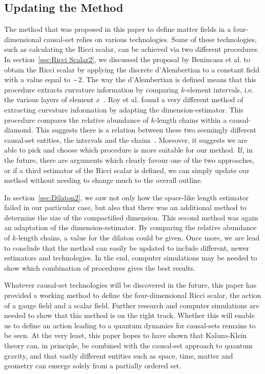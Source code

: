 \documentclass[a4paper,12pt]{article}
\numberwithin{equation}{section}
\begin{document}
\subsection{Updating the Method}
\label{sec:Updating the Method}

The method that was proposed in this paper to define matter fields in a four-dimensional causal-set relies on various technologies. Some of these technologies, such as calculating the Ricci scalar, can be achieved via two different procedures. In section~\ref{sec:Ricci Scalar2}, we discussed the proposal by Benincasa et al. to obtain the Ricci scalar by applying the discrete d'Alembertian to a constant field with a value equal to $-2$. The way the d'Alembertian is defined means that this procedure extracts curvature information by comparing $k$-element intervals, i.e. the various layers of element $x$~\cite{Benincasa2010}. Roy et al. found a very different method of extracting curvature information by adapting the dimension-estimator. This procedure compares the relative abundance of $k$-length chains within a causal-diamond. This suggests there is a relation between these two seemingly different causal-set entities, the intervals and the chains~\cite{Roy2012}. Moreover, it suggests we are able to pick and choose which procedure is more suitable for our method. If, in the future, there are arguments which clearly favour one of the two approaches, or if a third estimator of the Ricci scalar is defined, we can simply update our method without needing to change much to the overall outline.

In section~\ref{sec:Dilaton2}, we saw not only how the space-like length estimator failed in our particular case, but also that there was an additional method to determine the size of the compactified dimension. This second method was again an adaptation of the dimension-estimator. By comparing the relative abundance of $k$-length chains, a value for the dilaton could be given. Once more, we are lead to conclude that the method can easily be updated to include different, newer estimators and technologies. In the end, computer simulations may be needed to show which combination of procedures gives the best results.

Whatever causal-set technologies will be discovered in the future, this paper has provided a working method to define the four-dimensional Ricci scalar, the action of a gauge field and a scalar field. Further research and computer simulations are needed to show that this method is on the right track. Whether this will enable us to define an action leading to a quantum dynamics for causal-sets remains to be seen. At the very least, this paper hopes to have shown that Kaluza-Klein theory can, in principle, be combined with the causal-set approach to quantum gravity, and that vastly different entities such as space, time, matter and geometry can emerge solely from a partially ordered set.
\end{document}
